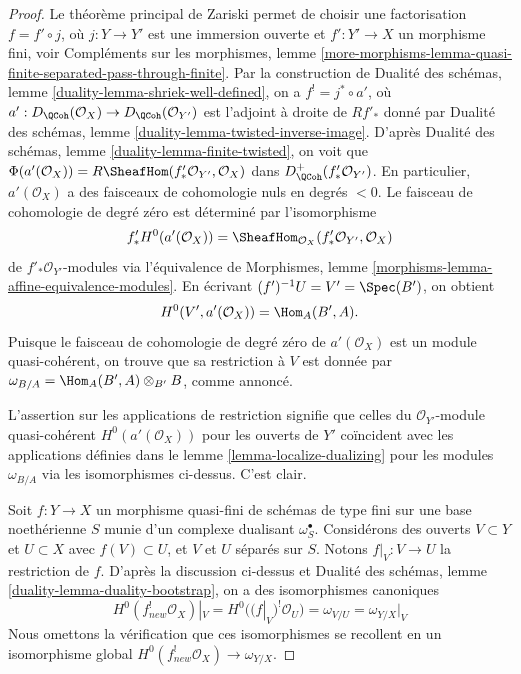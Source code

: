 \begin{proof}
Le théorème principal de Zariski permet de choisir une factorisation $f = f' \circ j$,
où $j : Y \to Y'$ est une immersion ouverte et $f' : Y' \to X$ un morphisme
fini, voir Compléments sur les morphismes, lemme
\ref{more-morphisms-lemma-quasi-finite-separated-pass-through-finite}.
Par la construction de
Dualité des schémas, lemme \ref{duality-lemma-shriek-well-defined}, on a
$f^! = j^* \circ a'$, où
$a' : D_\QCoh(\mathcal{O}_X) \to D_\QCoh(\mathcal{O}_{Y'})$
est l'adjoint à droite de $Rf'_*$ donné par
Dualité des schémas, lemme \ref{duality-lemma-twisted-inverse-image}.
D'après Dualité des schémas, lemme \ref{duality-lemma-finite-twisted},
on voit que
$\Phi(a'(\mathcal{O}_X)) = R\SheafHom(f'_*\mathcal{O}_{Y'}, \mathcal{O}_X)$ dans
$D_\QCoh^+(f'_*\mathcal{O}_{Y'})$. En particulier, $a'(\mathcal{O}_X)$ a des
faisceaux de cohomologie nuls en degrés $< 0$. Le faisceau de cohomologie de degré zéro
est déterminé par l'isomorphisme
$$
f'_*H^0(a'(\mathcal{O}_X)) =
\SheafHom_{\mathcal{O}_X}(f'_*\mathcal{O}_{Y'}, \mathcal{O}_X)
$$
de $f'_*\mathcal{O}_{Y'}$-modules via l'équivalence de
Morphismes, lemme \ref{morphisms-lemma-affine-equivalence-modules}.
En écrivant $(f')^{-1}U = V' = \Spec(B')$, on obtient
$$
H^0(V', a'(\mathcal{O}_X)) = \Hom_A(B', A).
$$
Puisque le faisceau de cohomologie de degré zéro de $a'(\mathcal{O}_X)$
est un module quasi-cohérent, on trouve que
sa restriction à $V$ est donnée par
$\omega_{B/A} = \Hom_A(B', A) \otimes_{B'} B$, comme annoncé.

\medskip\noindent
L'assertion sur les applications de restriction signifie que celles
du $\mathcal{O}_{Y'}$-module quasi-cohérent $H^0(a'(\mathcal{O}_X))$
pour les ouverts de $Y'$ coïncident avec les applications définies dans le
lemme \ref{lemma-localize-dualizing}
pour les modules $\omega_{B/A}$ via les isomorphismes ci-dessus.
C'est clair.

\medskip\noindent
Soit $f : Y \to X$ un morphisme quasi-fini de schémas de type fini
sur une base noethérienne $S$ munie d'un complexe dualisant $\omega_S^\bullet$.
Considérons des ouverts $V \subset Y$ et $U \subset X$ avec $f(V) \subset U$,
et $V$ et $U$ séparés sur $S$. Notons $f|_V : V \to U$ la restriction
de $f$. D'après la discussion ci-dessus et
Dualité des schémas, lemme \ref{duality-lemma-duality-bootstrap},
on a des isomorphismes canoniques
$$
H^0(f_{new}^!\mathcal{O}_X)|_V = H^0((f|_V)^!\mathcal{O}_U) = \omega_{V/U} =
\omega_{Y/X}|_V
$$
Nous omettons la vérification que ces isomorphismes se recollent en un isomorphisme
global $H^0(f_{new}^!\mathcal{O}_X) \to \omega_{Y/X}$.
\end{proof}

